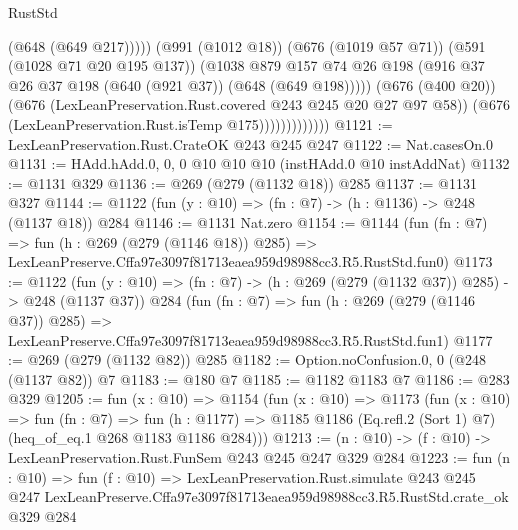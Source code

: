 \begin{lexlean}{RustStd}
\begin{coremodule}
                                  (@648 (@649 @217)))))
                            (@991 (@1012 @18))
                            (@676 (@1019 @57 @71))
                            (@591 (@1028 @71 @20 @195 @137))
                            (@1038
                              @879
                              @157
                              @74
                              @26
                              @198
                              (@916 @37 @26 @37 @198 (@640 (@921 @37)) (@648 (@649 @198)))))
                          (@676 (@400 @20))
                          (@676 (LexLeanPreservation.Rust.covered @243 @245 @20 @27 @97 @58))
                          (@676 (LexLeanPreservation.Rust.isTemp @175)))))))))))))
@1121 := LexLeanPreservation.Rust.CrateOK @243 @245 @247
@1122 := Nat.casesOn.{0}
@1131 := HAdd.hAdd.{0, 0, 0} @10 @10 @10 (instHAdd.{0} @10 instAddNat)
@1132 := @1131 @329
@1136 := @269 (@279 (@1132 @18)) @285
@1137 := @1131 @327
@1144 := @1122 (fun (y : @10) => (fn : @7) -> (h : @1136) -> @248 (@1137 @18)) @284
@1146 := @1131 Nat.zero
@1154 := @1144
    (fun (fn : @7) =>
    fun (h : @269 (@279 (@1146 @18)) @285) =>
    LexLeanPreserve.Cffa97e3097f81713eaea959d98988cc3.R5.RustStd.fun0)
@1173 := @1122
    (fun (y : @10) => (fn : @7) -> (h : @269 (@279 (@1132 @37)) @285) -> @248 (@1137 @37))
    @284
    (fun (fn : @7) =>
    fun (h : @269 (@279 (@1146 @37)) @285) =>
    LexLeanPreserve.Cffa97e3097f81713eaea959d98988cc3.R5.RustStd.fun1)
@1177 := @269 (@279 (@1132 @82)) @285
@1182 := Option.noConfusion.{0, 0} (@248 (@1137 @82)) @7
@1183 := @180 @7
@1185 := @1182 @1183 @7
@1186 := @283 @329
@1205 := fun (x : @10) =>
  @1154
    (fun (x : @10) =>
    @1173
      (fun (x : @10) =>
      fun (fn : @7) =>
      fun (h : @1177) =>
      @1185 @1186 (Eq.refl.{2} (Sort 1) @7) (heq_of_eq.{1} @268 @1183 @1186 @284)))
@1213 := (n : @10) -> (f : @10) -> LexLeanPreservation.Rust.FunSem @243 @245 @247 @329 @284
@1223 := fun (n : @10) =>
  fun (f : @10) =>
  LexLeanPreservation.Rust.simulate
    @243
    @245
    @247
    LexLeanPreserve.Cffa97e3097f81713eaea959d98988cc3.R5.RustStd.crate_ok
    @329
    @284
\end{coremodule}
\end{lexlean}
